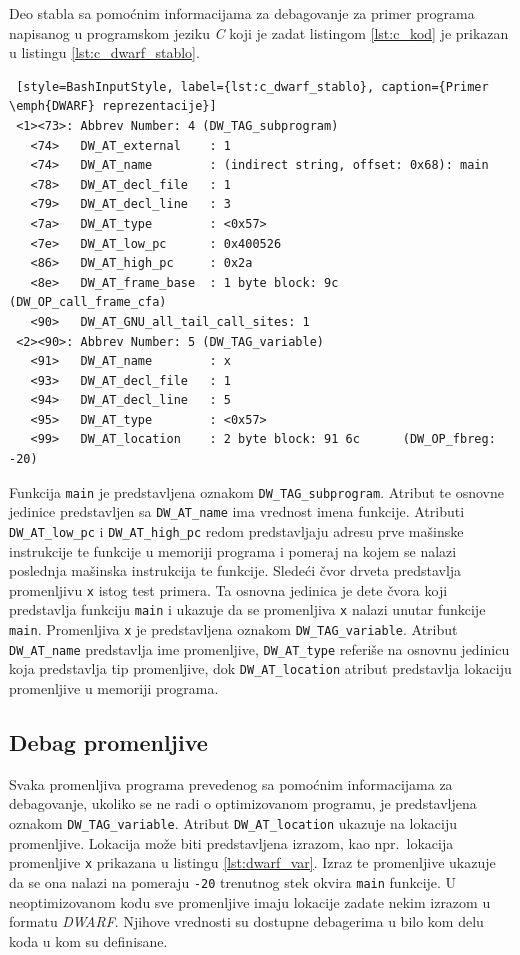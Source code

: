 \documentclass[12pt,oneside]{memoir}
\begin{document}
Deo stabla sa pomoćnim informacijama za debagovanje za primer programa napisanog u programskom jeziku \emph{C} koji je zadat listingom \ref{lst:c_kod} je prikazan u listingu \ref{lst:c_dwarf_stablo}.
\begin{lstlisting} [style=BashInputStyle, label={lst:c_dwarf_stablo}, caption={Primer \emph{DWARF} reprezentacije}]
 <1><73>: Abbrev Number: 4 (DW_TAG_subprogram)
   <74>   DW_AT_external    : 1
   <74>   DW_AT_name        : (indirect string, offset: 0x68): main
   <78>   DW_AT_decl_file   : 1
   <79>   DW_AT_decl_line   : 3
   <7a>   DW_AT_type        : <0x57>
   <7e>   DW_AT_low_pc      : 0x400526
   <86>   DW_AT_high_pc     : 0x2a
   <8e>   DW_AT_frame_base  : 1 byte block: 9c         (DW_OP_call_frame_cfa)
   <90>   DW_AT_GNU_all_tail_call_sites: 1
 <2><90>: Abbrev Number: 5 (DW_TAG_variable)
   <91>   DW_AT_name        : x
   <93>   DW_AT_decl_file   : 1
   <94>   DW_AT_decl_line   : 5
   <95>   DW_AT_type        : <0x57>
   <99>   DW_AT_location    : 2 byte block: 91 6c      (DW_OP_fbreg: -20)
\end{lstlisting}

Funkcija \texttt{main} je predstavljena oznakom \texttt{DW\_TAG\_subprogram}. Atribut te osnovne jedinice predstavljen sa \texttt{DW\_AT\_name} ima vrednost imena funkcije. Atributi \texttt{DW\_AT\_low\_pc} i \texttt{DW\_AT\_high\_pc} redom predstavljaju adresu prve mašinske instrukcije te funkcije u memoriji programa i pomeraj na kojem se nalazi poslednja mašinska instrukcija te funkcije. Sledeći čvor drveta predstavlja promenljivu \texttt{x} istog test primera. Ta osnovna jedinica je dete čvora koji predstavlja funkciju \texttt{main} i ukazuje da se promenljiva \texttt{x} nalazi unutar funkcije \texttt{main}. Promenljiva \texttt{x} je predstavljena oznakom \texttt{DW\_TAG\_variable}. Atribut \texttt{DW\_AT\_name} predstavlja ime promenljive, \texttt{DW\_AT\_type} referiše na osnovnu jedinicu koja predstavlja tip promenljive, dok \texttt{DW\_AT\_location} atribut predstavlja lokaciju promenljive u memoriji programa. 

\subsection{Debag promenljive}

Svaka promenljiva programa prevedenog sa pomoćnim informacijama za debagovanje, ukoliko se ne radi o optimizovanom programu, je predstavljena oznakom \texttt{DW\_TAG\_variable}. Atribut \texttt{DW\_AT\_location} ukazuje na lokaciju promenljive. Lokacija može biti predstavljena izrazom, kao npr.~lokacija promenljive \texttt{x} prikazana u listingu \ref{lst:dwarf_var}. Izraz te promenljive ukazuje da se ona nalazi na pomeraju \texttt{-20} trenutnog stek okvira \texttt{main} funkcije. U neoptimizovanom kodu sve promenljive imaju lokacije zadate nekim izrazom u formatu \emph{DWARF}. Njihove vrednosti su dostupne debagerima u bilo kom delu koda u kom su definisane.
\end{document}
